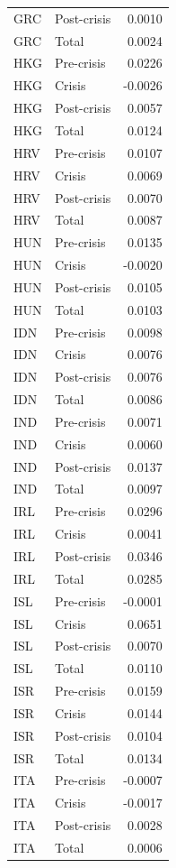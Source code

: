 \begin{longtable}[t]{llr}
\addlinespace
GRC & Post-crisis & 0.0010\\
GRC & Total & 0.0024\\
HKG & Pre-crisis & 0.0226\\
HKG & Crisis & -0.0026\\
HKG & Post-crisis & 0.0057\\
\addlinespace
HKG & Total & 0.0124\\
HRV & Pre-crisis & 0.0107\\
HRV & Crisis & 0.0069\\
HRV & Post-crisis & 0.0070\\
HRV & Total & 0.0087\\
\addlinespace
HUN & Pre-crisis & 0.0135\\
HUN & Crisis & -0.0020\\
HUN & Post-crisis & 0.0105\\
HUN & Total & 0.0103\\
IDN & Pre-crisis & 0.0098\\
\addlinespace
IDN & Crisis & 0.0076\\
IDN & Post-crisis & 0.0076\\
IDN & Total & 0.0086\\
IND & Pre-crisis & 0.0071\\
IND & Crisis & 0.0060\\
\addlinespace
IND & Post-crisis & 0.0137\\
IND & Total & 0.0097\\
IRL & Pre-crisis & 0.0296\\
IRL & Crisis & 0.0041\\
IRL & Post-crisis & 0.0346\\
\addlinespace
IRL & Total & 0.0285\\
ISL & Pre-crisis & -0.0001\\
ISL & Crisis & 0.0651\\
ISL & Post-crisis & 0.0070\\
ISL & Total & 0.0110\\
\addlinespace
ISR & Pre-crisis & 0.0159\\
ISR & Crisis & 0.0144\\
ISR & Post-crisis & 0.0104\\
ISR & Total & 0.0134\\
ITA & Pre-crisis & -0.0007\\
\addlinespace
ITA & Crisis & -0.0017\\
ITA & Post-crisis & 0.0028\\
ITA & Total & 0.0006\\

\end{longtable}
